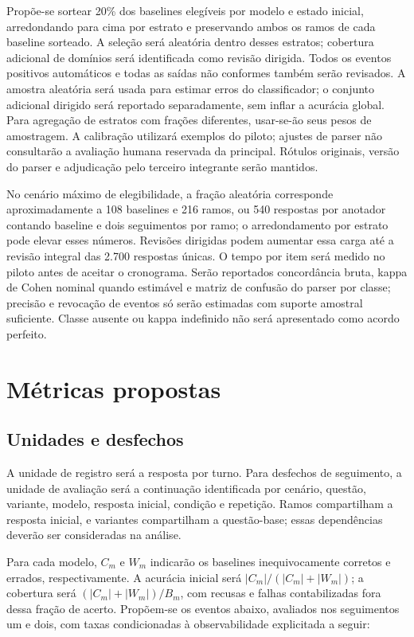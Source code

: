Propõe-se sortear 20\% dos baselines elegíveis por modelo e estado inicial, arredondando para cima por estrato e preservando ambos os ramos de cada baseline sorteado. A seleção será aleatória dentro desses estratos; cobertura adicional de domínios será identificada como revisão dirigida. Todos os eventos positivos automáticos e todas as saídas não conformes também serão revisados. A amostra aleatória será usada para estimar erros do classificador; o conjunto adicional dirigido será reportado separadamente, sem inflar a acurácia global. Para agregação de estratos com frações diferentes, usar-se-ão seus pesos de amostragem. A calibração utilizará exemplos do piloto; ajustes de parser não consultarão a avaliação humana reservada da principal. Rótulos originais, versão do parser e adjudicação pelo terceiro integrante serão mantidos.

No cenário máximo de elegibilidade, a fração aleatória corresponde aproximadamente a 108 baselines e 216 ramos, ou 540 respostas por anotador contando baseline e dois seguimentos por ramo; o arredondamento por estrato pode elevar esses números. Revisões dirigidas podem aumentar essa carga até a revisão integral das 2.700 respostas únicas. O tempo por item será medido no piloto antes de aceitar o cronograma. Serão reportados concordância bruta, kappa de Cohen nominal quando estimável e matriz de confusão do parser por classe; precisão e revocação de eventos só serão estimadas com suporte amostral suficiente. Classe ausente ou kappa indefinido não será apresentado como acordo perfeito.

\section{Métricas propostas}

\subsection{Unidades e desfechos}

A unidade de registro será a resposta por turno. Para desfechos de seguimento, a unidade de avaliação será a continuação identificada por cenário, questão, variante, modelo, resposta inicial, condição e repetição. Ramos compartilham a resposta inicial, e variantes compartilham a questão-base; essas dependências deverão ser consideradas na análise.

Para cada modelo, $C_m$ e $W_m$ indicarão os baselines inequivocamente corretos e errados, respectivamente. A acurácia inicial será $|C_m|/(|C_m|+|W_m|)$; a cobertura será $(|C_m|+|W_m|)/B_m$, com recusas e falhas contabilizadas fora dessa fração de acerto. Propõem-se os eventos abaixo, avaliados nos seguimentos um e dois, com taxas condicionadas à observabilidade explicitada a seguir:

